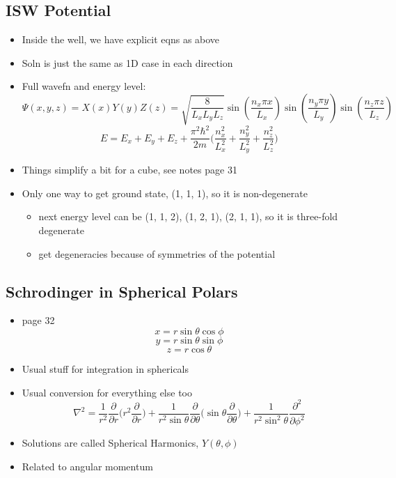 \documentclass[a4paper,11pt,normalem]{article}
\begin{document}
\subsection{ISW Potential}\label{isw-potential}

\begin{itemize}
\item
  Inside the well, we have explicit eqns as above
\item
  Soln is just the same as 1D case in each direction
\item
  Full wavefn and energy level: \[
  \Psi(x,y,z) = X(x)Y(y)Z(z) = \sqrt{\frac{8}{L_{x}L_{y}L_{z}}}\sin(\frac{n_x \pi x}{L_x})\sin(\frac{n_y \pi y}{L_y})\sin(\frac{n_z \pi z}{L_z})
  \] \[
  E = E_x + E_y + E_z + \frac{\pi^2 \hbar^2}{2m} \Big(\frac{n_{x}^2}{L_{x}^2} + \frac{n_{y}^2}{L_{y}^2} + \frac{n_{z}^2}{L_{z}^2} \Big)
  \]
\item
  Things simplify a bit for a cube, see notes page 31
\item
  Only one way to get ground state, (1, 1, 1), so it is non-degenerate
  \begin{itemize}
  \item
    next energy level can be (1, 1, 2), (1, 2, 1), (2, 1, 1), so it is
    three-fold degenerate
  \item
    get degeneracies because of symmetries of the potential
  \end{itemize}
\end{itemize}

\subsection{Schrodinger in Spherical Polars}\label{schrodinger-in-spherical-polars}

\begin{itemize}
\item
  page 32 \[
  x = r\sin\theta\cos\phi
  \] \[
  y = r\sin\theta\sin\phi
  \] \[
  z = r\cos\theta
  \]
\item
  Usual stuff for integration in sphericals
\item
  Usual conversion for everything else too \[
  \nabla^2 = \frac{1}{r^2}\frac{\partial}{\partial r}\Big(r^2 \frac{\partial}{\partial r} \Big) + \frac{1}{r^2 \sin\theta}\frac{\partial}{\partial \theta} \Big(\sin\theta \frac{\partial}{\partial\theta} \Big) + \frac{1}{r^2 \sin^2\theta} \frac{\partial^2}{\partial \phi^2}
  \]
\item
  Solutions are called Spherical Harmonics, \(Y(\theta, \phi)\)
\item
  Related to angular momentum
\end{itemize}
\end{document}
